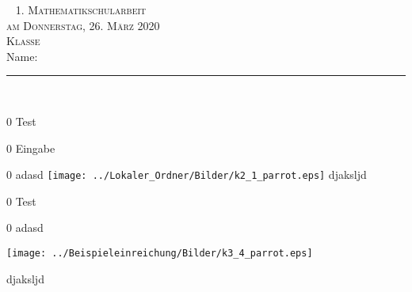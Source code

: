 \documentclass[a4paper,12pt]{report}
\begin{document}
\begin{titlepage}
\flushright
~\vfil 
\textsc{\Huge 1. Mathematikschularbeit} \\ 
[2cm] 
\textsc{\Large am Donnerstag, 26. März 2020}\\ [1cm] 
\textsc{\Large Klasse } \\ [1cm] 
\Large Name: \rule{8cm}{0.4pt} \\ 
\vfil\vfil\vfil 
\end{titlepage}

\begin{langesbeispiel} \item[0]
Test

\end{langesbeispiel}

\begin{langesbeispiel} \item[0]
Eingabe	

\end{langesbeispiel}

\begin{langesbeispiel} \item[0]
adasd \texttt{[image: ../Lokaler\_Ordner/Bilder/k2\_1\_parrot.eps]} djaksljd

\end{langesbeispiel}

\begin{langesbeispiel} \item[0]
Test

\end{langesbeispiel}

\begin{langesbeispiel} \item[0]
adasd 

\texttt{[image: ../Beispieleinreichung/Bilder/k3\_4\_parrot.eps]}

djaksljd

\end{langesbeispiel}



\end{document}
